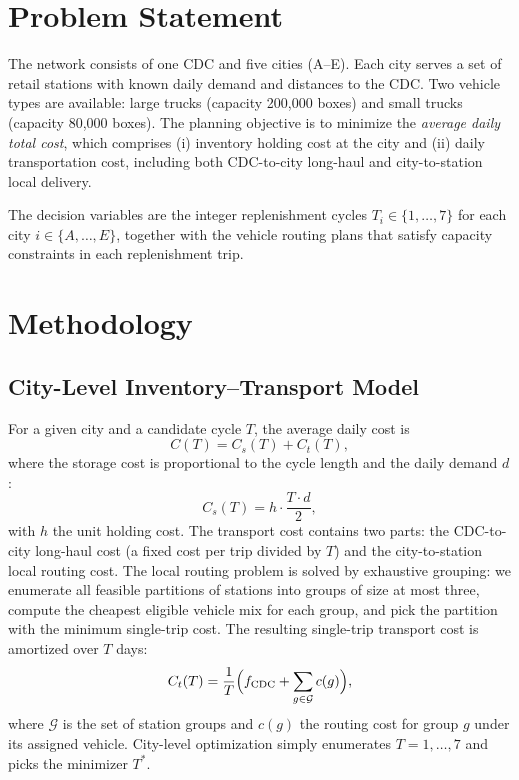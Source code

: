 \documentclass[10pt]{article}
\begin{document}
\section{Problem Statement}
The network consists of one CDC and five cities (A--E). Each city serves a set of retail stations with known daily demand and distances to the CDC. Two vehicle types are available: large trucks (capacity 200,000 boxes) and small trucks (capacity 80,000 boxes). The planning objective is to minimize the \emph{average daily total cost}, which comprises (i) inventory holding cost at the city and (ii) daily transportation cost, including both CDC-to-city long-haul and city-to-station local delivery.

The decision variables are the integer replenishment cycles $T_i \in \{1,\dots,7\}$ for each city $i \in \{A,\dots,E\}$, together with the vehicle routing plans that satisfy capacity constraints in each replenishment trip.

\section{Methodology}
\subsection{City-Level Inventory--Transport Model}
For a given city and a candidate cycle $T$, the average daily cost is
\begin{equation}
    C(T) = C_s(T) + C_t(T),
\end{equation}
where the storage cost is proportional to the cycle length and the daily demand $d$:
\begin{equation}
    C_s(T) = h \cdot \frac{T \cdot d}{2},
\end{equation}
with $h$ the unit holding cost. The transport cost contains two parts: the CDC-to-city long-haul cost (a fixed cost per trip divided by $T$) and the city-to-station local routing cost. The local routing problem is solved by exhaustive grouping: we enumerate all feasible partitions of stations into groups of size at most three, compute the cheapest eligible vehicle mix for each group, and pick the partition with the minimum single-trip cost. The resulting single-trip transport cost is amortized over $T$ days:
\begin{equation}
    C_t(T) = \frac{1}{T}\Bigl(f_{\text{CDC}} + \sum_{g \in \mathcal{G}} c(g)\Bigr),
\end{equation}
where $\mathcal{G}$ is the set of station groups and $c(g)$ the routing cost for group $g$ under its assigned vehicle. City-level optimization simply enumerates $T=1,\dots,7$ and picks the minimizer $T^*$.
\end{document}
